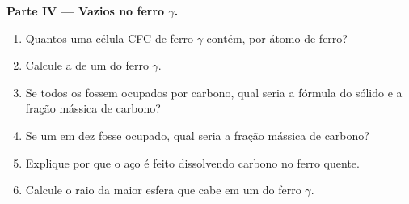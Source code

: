 \begin{problem}
\medskip
\noindent\textbf{Parte IV --- Vazios no ferro $\gamma$.}
\begin{enumerate}[resume]
  \item Quantos  uma célula CFC de ferro $\gamma$
        contém, por átomo de ferro?
  \item Calcule a  de um  do ferro $\gamma$.
  \item Se todos os  fossem ocupados por carbono, qual
        seria a fórmula do sólido e a fração mássica de carbono?
  \item Se um  em dez fosse ocupado, qual seria a fração
        mássica de carbono?
  \item Explique por que o aço é feito dissolvendo carbono no ferro quente.
  \item Calcule o raio da maior esfera que cabe em um 
        do ferro $\gamma$.
\end{enumerate}
\end{problem}
